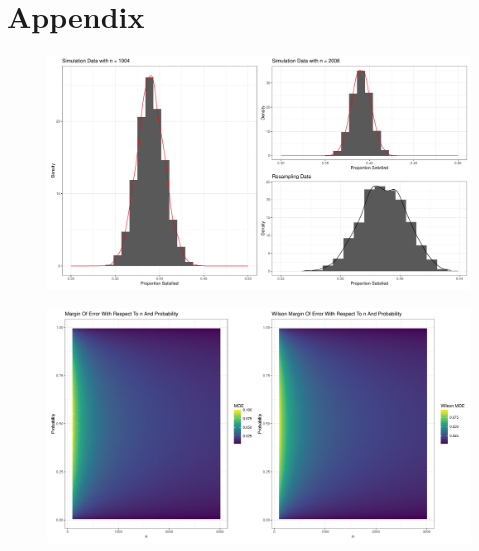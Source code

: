 \documentclass{article}\usepackage[]{graphicx}\usepackage[]{xcolor}
\begin{document}
\newpage
\onecolumn
\section{Appendix}

  \begin{figure}[H]
    \begin{center}
       \includegraphics[scale=0.35]{graphs.pdf}
       \caption{}
     \label{moe}
     \end{center}
   \end{figure}
   \begin{figure}[H]
    \begin{center}
       \includegraphics[scale=0.35]{raster.pdf}
       \caption{}
     \label{moe}
     \end{center}
   \end{figure}
\end{document}
